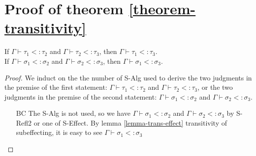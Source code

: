 \section{Proof of theorem \ref{theorem-transitivity}}
If $\Gamma \vdash \tau_1 <: \tau_2$ and $\Gamma \vdash \tau_2 <: \tau_3$, then $\Gamma \vdash \tau_1 <: \tau_3$. \\
If $\Gamma \vdash \sigma_1 <: \sigma_2$ and $\Gamma \vdash \sigma_2 <: \sigma_3$, then $\Gamma \vdash \sigma_1 <: \sigma_3$. 
\begin{proof}
We induct on the the number of S-Alg used to derive the two judgments in the premise of the first statement: $\Gamma \vdash \tau_1 <: \tau_2$ and $\Gamma \vdash \tau_2 <: \tau_3$, or the two judgments in the premise of the second statement: $\Gamma \vdash \sigma_1 <: \sigma_2$ and $\Gamma \vdash \sigma_2 <: \sigma_3$.
\begin{itemize}
\item[BC] The S-Alg is not used, so we have $\Gamma \vdash \sigma_1 <: \sigma_2$ and $\Gamma \vdash \sigma_2 <: \sigma_3$ by S-Refl2 or one of S-Effect.  By lemma \ref{lemma-trans-effect} transitivity of subeffecting, it is easy to see $\Gamma \vdash \sigma_1 <: \sigma_3$


\end{itemize}
\end{proof}
